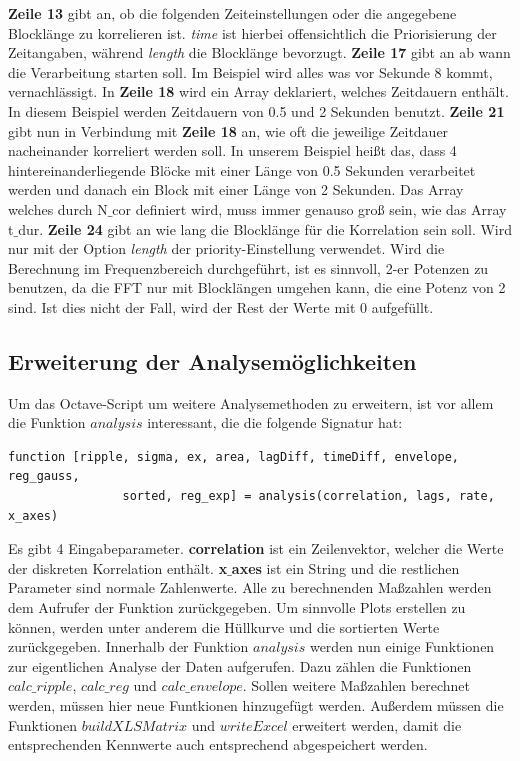 \textbf{Zeile 13} gibt an, ob die folgenden Zeiteinstellungen oder die angegebene Blocklänge zu korrelieren ist. \textit{time} ist hierbei offensichtlich die Priorisierung der Zeitangaben, während \textit{length} die Blocklänge bevorzugt.\newline
\textbf{Zeile 17} gibt an ab wann die Verarbeitung starten soll. Im Beispiel wird alles was vor Sekunde 8 kommt, vernachlässigt. \newline
In \textbf{Zeile 18} wird ein Array deklariert, welches Zeitdauern enthält. In diesem Beispiel werden Zeitdauern von 0.5 und 2 Sekunden benutzt. \newline
\textbf{Zeile 21} gibt nun in Verbindung mit \textbf{Zeile 18} an, wie oft die jeweilige Zeitdauer nacheinander korreliert werden soll. In unserem Beispiel heißt das, dass 4 hintereinanderliegende Blöcke mit einer Länge von 0.5 Sekunden verarbeitet werden und danach ein Block mit einer Länge von 2 Sekunden. Das Array welches durch N$\_$cor definiert wird, muss immer genauso groß sein, wie das Array t$\_$dur.\newline
\textbf{Zeile 24} gibt an wie lang die Blocklänge für die Korrelation sein soll. Wird nur mit der Option \textit{length} der priority-Einstellung verwendet. Wird die Berechnung im Frequenzbereich durchgeführt, ist es sinnvoll, 2-er Potenzen zu benutzen, da die FFT nur mit Blocklängen umgehen kann, die eine Potenz von 2 sind. Ist dies nicht der Fall, wird der Rest der Werte mit 0 aufgefüllt.\newline

\subsection{Erweiterung der Analysemöglichkeiten}
Um das Octave-Script um weitere Analysemethoden zu erweitern, ist vor allem die Funktion $analysis$ interessant, die die folgende Signatur hat:
\begin{lstlisting}
function [ripple, sigma, ex, area, lagDiff, timeDiff, envelope, reg_gauss, 
                sorted, reg_exp] = analysis(correlation, lags, rate, x_axes)
\end{lstlisting}
Es gibt 4 Eingabeparameter. \textbf{correlation} ist ein Zeilenvektor, welcher die Werte der diskreten Korrelation enthält. \textbf{x$\_$axes} ist ein String und die restlichen Parameter sind normale Zahlenwerte. Alle zu berechnenden Maßzahlen werden dem Aufrufer der Funktion zurückgegeben. Um sinnvolle Plots erstellen zu können, werden unter anderem die Hüllkurve und die sortierten Werte zurückgegeben.  
Innerhalb der Funktion $analysis$ werden nun einige Funktionen zur eigentlichen Analyse der Daten aufgerufen. Dazu zählen die Funktionen $calc\_ripple$, $calc\_reg$ und $calc\_envelope$. Sollen weitere Maßzahlen berechnet werden, müssen hier neue Funtkionen hinzugefügt werden. Außerdem müssen die Funktionen $buildXLSMatrix$ und $writeExcel$ erweitert werden, damit die entsprechenden Kennwerte auch entsprechend abgespeichert werden.
